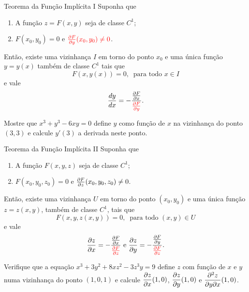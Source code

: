 \begin{frame}[label=der-parciais]{Teorema da Função Implícita I}
Suponha que 
\begin{enumerate}
\item A função $z=F(x,y)$ seja de {\color{blue}classe $C^1$};

\item $F(x_0,y_0)=0$ e ${\color{red}\frac{\partial F}{\partial y}(x_0,y_0)\neq 0}$.
\end{enumerate}
Então, existe uma vizinhança $I$ em torno do ponto $x_0$ e uma {\color{blue}única} função $y=y(x)$ {\color{blue}também de classe $C^1$} tais que 
\[F(x,y(x))=0,\ \text{ para todo } x\in I \]
 e vale
 \[   {\frac{dy}{dx}}=\displaystyle -\frac{\frac{\partial F}{\partial x}}{{\color{red}{\frac{\partial F}{\partial y}}}}.\] 

\begin{exe}
Mostre que $x^3+y^3-6xy=0$ define $y$ como função de $x$ na vizinhança do ponto $(3,3)$ e calcule $y'(3)$ a derivada neste ponto.
\end{exe}

\end{frame}


\begin{frame}[label=der-parciais]{Teorema da Função Implícita II}
Suponha que 
\begin{enumerate}
\item A função $F(x,y,z)$ seja de {\color{blue}classe $C^1$};

\item $F(x_0,y_0,z_0)=0$ e {\color{red}$\frac{\partial F}{\partial z}(x_0,y_0,z_0)\neq 0$}.
\end{enumerate}
Então, existe uma vizinhança $U$ em torno do ponto $(x_0,y_0)$ e uma {\color{blue}única} função $z=z(x,y)$, {\color{blue} também de classe $C^1$}, tais que 
\[F(x,y,z(x,y))=0,\ \text{ para todo } (x,y)\in U \]
 e vale
 \[   \frac{\partial z}{\partial x}=\displaystyle -\frac{\frac{\partial F}{\partial x}}{{\color{red}{\frac{\partial F}{\partial z}}}}\text{ e }   \frac{\partial z}{\partial y}=\displaystyle -\frac{\frac{\partial F}{\partial y}}{{\color{red}{\frac{\partial F}{\partial z}}}}.\] 


\end{frame}


\begin{frame}[label=der-parciais]
\begin{exe}
Verifique que a equação $x^3+3y^2+8xz^2-3z^3y=9$ define $z$ com função de $x$ e $y$ numa vizinhança do ponto $(1,0,1)$ e calcule $\displaystyle\frac{\partial z}{\partial x}(1,0)$, $\displaystyle\frac{\partial z}{\partial y}(1,0)$ e $\displaystyle\frac{\partial^2  z}{\partial y\partial x}(1,0)$.
\end{exe}
\end{frame}


